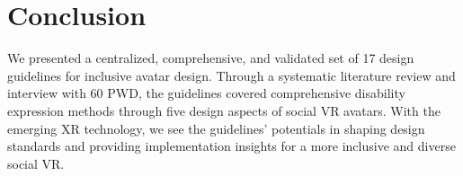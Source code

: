 \section{Conclusion}

We presented a centralized, comprehensive, and validated set of 17 design guidelines for inclusive avatar design. Through a systematic literature review and interview with 60 PWD, the guidelines covered comprehensive disability expression methods through five design aspects of social VR avatars. With the emerging XR technology, we see the guidelines' potentials in shaping design standards and providing implementation insights for a more inclusive and diverse social VR. 